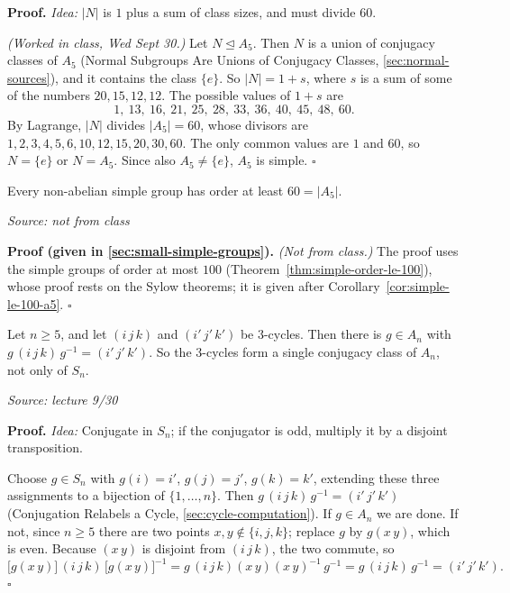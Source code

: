 \documentclass[11pt]{report}
\renewenvironment{proof}[1][Proof]{\noindent\textbf{#1.} }{\hfill$\square$\par\vspace{5pt}}
\newcommand{\srcline}[1]{\par\hfill{\footnotesize\textit{Source: #1}}}
\begin{document}
\begin{proof}
\textit{Idea:} $|N|$ is $1$ plus a sum of class sizes, and must divide $60$.\par
\textit{(Worked in class, Wed Sept 30.)} Let $N \trianglelefteq A_5$. Then $N$ is a union of conjugacy classes of $A_5$ (Normal Subgroups Are Unions of Conjugacy Classes, \ref{sec:normal-sources}), and it contains the class $\{e\}$. So $|N| = 1 + s$, where $s$ is a sum of some of the numbers $20, 15, 12, 12$. The possible values of $1 + s$ are
\[ 1,\ 13,\ 16,\ 21,\ 25,\ 28,\ 33,\ 36,\ 40,\ 45,\ 48,\ 60. \]
By Lagrange, $|N|$ divides $|A_5| = 60$, whose divisors are $1, 2, 3, 4, 5, 6, 10, 12, 15, 20, 30, 60$. The only common values are $1$ and $60$, so $N = \{e\}$ or $N = A_5$. Since also $A_5 \neq \{e\}$, $A_5$ is simple.
\end{proof}

\begin{thmbox}\label{thm:a5-smallest-non-abelian-simple-group}
Every non-abelian simple group has order at least $60 = |A_5|$.
\srcline{not from class}
\end{thmbox}

\begin{proof}[Proof (given in \ref{sec:small-simple-groups})]
\textit{(Not from class.)} The proof uses the simple groups of order at most $100$ (Theorem~\ref{thm:simple-order-le-100}), whose proof rests on the Sylow theorems; it is given after Corollary~\ref{cor:simple-le-100-a5}.
\end{proof}

\begin{lembox}\label{lem:3-cycles-conjugate-an-n-ge-5}
Let $n \geq 5$, and let $(i\,j\,k)$ and $(i'\,j'\,k')$ be $3$-cycles. Then there is $g \in A_n$ with $g\,(i\,j\,k)\,g^{-1} = (i'\,j'\,k')$. So the $3$-cycles form a single conjugacy class of $A_n$, not only of $S_n$.
\srcline{lecture 9/30}
\end{lembox}

\begin{proof}
\textit{Idea:} Conjugate in $S_n$; if the conjugator is odd, multiply it by a disjoint transposition.\par
Choose $g \in S_n$ with $g(i) = i'$, $g(j) = j'$, $g(k) = k'$, extending these three assignments to a bijection of $\{1, \ldots, n\}$. Then $g\,(i\,j\,k)\,g^{-1} = (i'\,j'\,k')$ (Conjugation Relabels a Cycle, \ref{sec:cycle-computation}). If $g \in A_n$ we are done. If not, since $n \geq 5$ there are two points $x, y \notin \{i, j, k\}$; replace $g$ by $g(x\,y)$, which is even. Because $(x\,y)$ is disjoint from $(i\,j\,k)$, the two commute, so
\[ \big[g(x\,y)\big]\,(i\,j\,k)\,\big[g(x\,y)\big]^{-1} = g\,(i\,j\,k)(x\,y)(x\,y)^{-1}\,g^{-1} = g\,(i\,j\,k)\,g^{-1} = (i'\,j'\,k'). \]
\end{proof}
\end{document}
